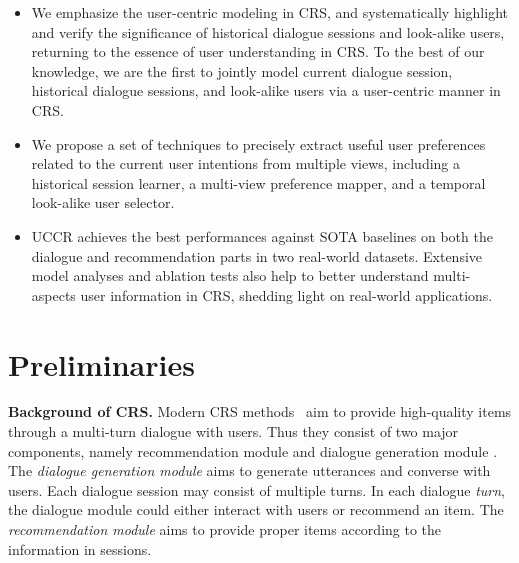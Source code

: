 \documentclass[sigconf,natbib=true]{acmart}
\begin{document}
\begin{itemize}[leftmargin=*]
  \item We emphasize the user-centric modeling in CRS, and systematically highlight and verify the significance of historical dialogue sessions and look-alike users, returning to the essence of user understanding in CRS. To the best of our knowledge, we are the first to jointly model current dialogue session, historical dialogue sessions, and look-alike users via a user-centric manner in CRS.
  \item We propose a set of techniques to precisely extract useful user preferences related to the current user intentions from multiple views, including a historical session learner, a multi-view preference mapper, and a temporal look-alike user selector.
  \item UCCR achieves the best performances against SOTA baselines on both the dialogue and recommendation parts in two real-world datasets. Extensive model analyses and ablation tests also help to better understand multi-aspects user information in CRS, shedding light on real-world applications.
\end{itemize}



\section{Preliminaries}



\noindent
\textbf{Background of CRS.}
Modern CRS methods~\cite{chen2019towards} aim to provide high-quality items through a multi-turn dialogue with users. Thus they consist of two major components, namely {recommendation module} and {dialogue generation module} \cite{zhou2020towards}.
The \emph{dialogue generation module} aims to generate utterances and converse with users. Each dialogue session may consist of multiple turns. In each dialogue \emph{turn}, the dialogue module could either interact with users or recommend an item. The \emph{recommendation module} aims to provide proper items according to the information in sessions.
\end{document}
